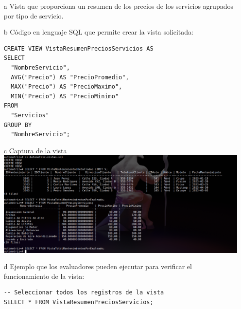 \documentclass[12pt]{article}
\begin{document}
    \begin{itemize}
        \item[a] Vista que proporciona un resumen de los precios de los servicios agrupados por tipo de servicio.
        \item[b] Código en lenguaje SQL que permite crear la vista solicitada:
        \begin{lstlisting}
CREATE VIEW VistaResumenPreciosServicios AS
SELECT
  "NombreServicio",
  AVG("Precio") AS "PrecioPromedio",
  MAX("Precio") AS "PrecioMaximo",
  MIN("Precio") AS "PrecioMinimo"
FROM
  "Servicios"
GROUP BY
  "NombreServicio";
        \end{lstlisting}
        \item[c] Captura de la vista
        \center\includegraphics[width=1.0\textwidth]{N.png}
        \item[d] Ejemplo que los evaluadores pueden ejecutar para verificar el funcionamiento de la vista:
        \begin{lstlisting}
-- Seleccionar todos los registros de la vista
SELECT * FROM VistaResumenPreciosServicios;
        \end{lstlisting}
    \end{itemize}
\end{document}
